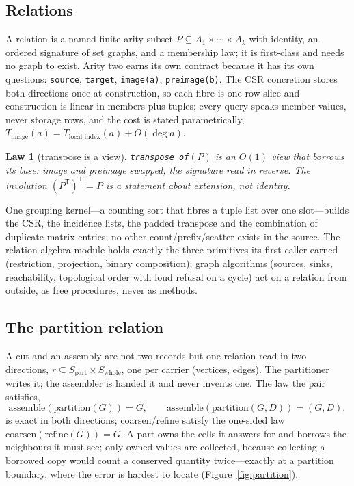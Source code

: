 \documentclass[11pt,a4paper]{article}
\newtheorem{law}{Law}
\newcommand{\tr}{^{\mathsf T}}
\newcommand{\code}[1]{\texttt{#1}}
\begin{document}
\subsection{Relations}\label{sec:relations}

A relation is a named finite-arity subset $P\subseteq A_1\times\cdots\times A_k$ with identity, an ordered signature of set graphs, and a membership law; it is first-class and needs no graph to exist. Arity two earns its own contract because it has its own questions: \code{source}, \code{target}, \code{image(a)}, \code{preimage(b)}. The CSR concretion stores both directions once at construction, so each fibre is one row slice and construction is linear in members plus tuples; every query speaks member values, never storage rows, and the cost is stated parametrically, $T_{\text{image}}(a) = T_{\text{local\_index}}(a) + O(\deg a)$.

\begin{law}[transpose is a view]
\code{transpose\_of}$(P)$ is an $O(1)$ view that borrows its base: image and preimage swapped, the signature read in reverse. The involution $(P\tr)\tr = P$ is a statement about extension, not identity.
\end{law}

One grouping kernel---a counting sort that fibres a tuple list over one slot---builds the CSR, the incidence lists, the padded transpose and the combination of duplicate matrix entries; no other count/prefix/scatter exists in the source. The relation algebra module holds exactly the three primitives its first caller earned (restriction, projection, binary composition); graph algorithms (sources, sinks, reachability, topological order with loud refusal on a cycle) act on a relation from outside, as free procedures, never as methods.

\subsection{The partition relation}\label{sec:partition}

A cut and an assembly are not two records but one relation read in two directions, $r\subseteq S_{\text{part}}\times S_{\text{whole}}$, one per carrier (vertices, edges). The partitioner writes it; the assembler is handed it and never invents one. The law the pair satisfies,
\[
\text{assemble}(\text{partition}(G)) = G,\qquad \text{assemble}(\text{partition}(G,D)) = (G,D),
\]
is exact in both directions; coarsen/refine satisfy the one-sided law $\text{coarsen}(\text{refine}(G)) = G$. A part owns the cells it answers for and borrows the neighbours it must see; only owned values are collected, because collecting a borrowed copy would count a conserved quantity twice---exactly at a partition boundary, where the error is hardest to locate (Figure~\ref{fig:partition}).
\end{document}
